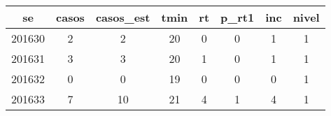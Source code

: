 \begin{tabular}{c|ccccccc}
  \hline
se & casos & casos\_est & tmin & rt & p\_rt1 & inc & nivel \\ 
  \hline
201630 & 2 & 2 & 20 & 0 & 0 & 1 & 1 \\ 
  201631 & 3 & 3 & 20 & 1 & 0 & 1 & 1 \\ 
  201632 & 0 & 0 & 19 & 0 & 0 & 0 & 1 \\ 
  201633 & 7 & 10 & 21 & 4 & 1 & 4 & 1 \\ 
   \hline
\end{tabular}

